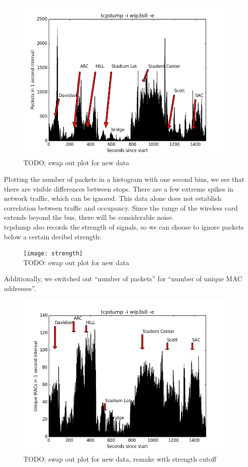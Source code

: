 \documentclass[letterpaper]{scrartcl}
\begin{document}
	\begin{figure}[H]
	\includegraphics[width=11cm]{packets}
	\\TODO: swap out plot for new data
	\centering
	\end{figure}

	Plotting the number of packets in a histogram with one second bins, we see that there are visible differences between stops.
	There are a few extreme spikes in network traffic, which can be ignored.
	This data alone does not establish correlation between traffic and occupancy. Since the range of the wireless card extends beyond the bus, there will be considerable noise.
	\\
	tcpdump also records the strength of signals, so we can choose to ignore packets below a certain decibel strength:

	\begin{figure}[H]
	\texttt{[image: strength]}
	\\TODO: swap out plot for new data
	\centering
	\end{figure}

	Additionally, we switched out ``number of packets'' for ``number of unique MAC addresses''.

	\begin{figure}[H]
	\includegraphics[width=11cm]{unique}
	\\TODO: swap out plot for new data, remake with strength cutoff
	\centering
	\end{figure}
\end{document}
